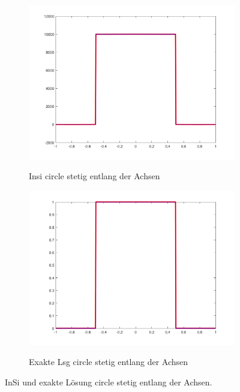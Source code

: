 \begin{figure}[p]
  \centering
  \begin{subfigure}[b]{.48\linewidth}
    \centering
    \caption{Insi circle stetig entlang der Achsen}
    \includegraphics[trim = 40 30 50 20, clip, width=\linewidth]
      {pictures/chapExperiments/secGrayscale/circ/cont/inSiAxis.png}
    \label{fig:circContInSiAxis}
  \end{subfigure}
  \quad
  \begin{subfigure}[b]{.48\linewidth}
    \centering
    \caption{Exakte Lsg circle stetig entlang der Achsen}
    \includegraphics[trim = 40 30 50 20, clip, width=\linewidth]
      {pictures/chapExperiments/secGrayscale/circ/cont/exactSolutionAxis.png}
    \label{fig:circContExactSolAxis}
  \end{subfigure}
  \caption{InSi und exakte Lösung circle stetig entlang der Achsen.}
  \label{fig:circContPlotsAxis}
\end{figure}

